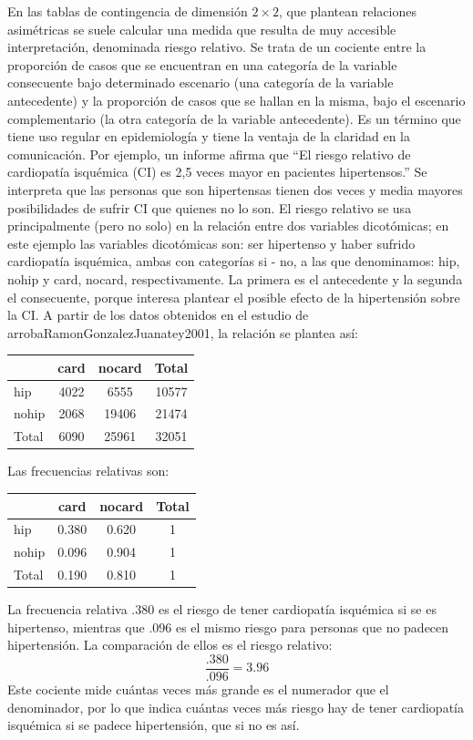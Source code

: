 \documentclass[]{book}
\begin{document}
En las tablas de contingencia de dimensión \(2\times2\), que plantean relaciones
asimétricas se suele calcular una medida que resulta de muy accesible
interpretación, denominada riesgo relativo. Se trata de un cociente
entre la proporción de casos que se encuentran en una categoría de la
variable consecuente bajo determinado escenario (una categoría de la
variable antecedente) y la proporción de casos que se hallan en la
misma, bajo el escenario complementario (la otra categoría de la
variable antecedente). Es un término que tiene uso regular en
epidemiología y tiene la ventaja de la claridad en la comunicación. Por
ejemplo, un informe afirma que ``El riesgo relativo de cardiopatía
isquémica (CI) es 2,5 veces mayor en pacientes hipertensos.'' Se
interpreta que las personas que son hipertensas tienen dos veces y media
mayores posibilidades de sufrir CI que quienes no lo son. El riesgo relativo
se usa principalmente (pero no solo) en la relación entre dos variables
dicotómicas; en este ejemplo las variables dicotómicas son: ser hipertenso y haber sufrido cardiopatía isquémica, ambas con categorías si - no, a las que denominamos: hip, nohip y card, nocard, respectivamente. La primera es el antecedente y la segunda el consecuente, porque interesa plantear el posible efecto de la hipertensión sobre la CI. A partir de los datos obtenidos en el estudio de arrobaRamonGonzalezJuanatey2001, la relación se plantea así:

\begin{longtable}[]{@{}lccc@{}}
\toprule
& card & nocard & Total\tabularnewline
\midrule
\endhead
hip & 4022 & 6555 & 10577\tabularnewline
nohip & 2068 & 19406 & 21474\tabularnewline
Total & 6090 & 25961 & 32051\tabularnewline
\bottomrule
\end{longtable}

Las frecuencias relativas son:

\begin{longtable}[]{@{}lccc@{}}
\toprule
& card & nocard & Total\tabularnewline
\midrule
\endhead
hip & 0.380 & 0.620 & 1\tabularnewline
nohip & 0.096 & 0.904 & 1\tabularnewline
Total & 0.190 & 0.810 & 1\tabularnewline
\bottomrule
\end{longtable}

La frecuencia relativa .380 es el riesgo de tener cardiopatía isquémica si se es hipertenso, mientras que .096 es el mismo riesgo para personas que no padecen hipertensión. La comparación de ellos es el riesgo relativo:
\[\frac{.380}{.096}=3.96\]
Este cociente mide cuántas veces más grande es el numerador que el denominador, por lo que indica cuántas veces más riesgo hay de tener cardiopatía isquémica si se padece hipertensión, que si no es así.
\end{document}
